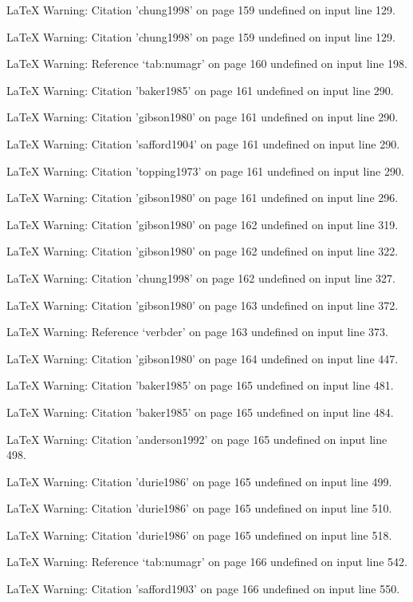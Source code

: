 LaTeX Warning: Citation 'chung1998' on page 159 undefined on input line 129.


LaTeX Warning: Citation 'chung1998' on page 159 undefined on input line 129.


LaTeX Warning: Reference `tab:numagr' on page 160 undefined on input line 198.


LaTeX Warning: Citation 'baker1985' on page 161 undefined on input line 290.


LaTeX Warning: Citation 'gibson1980' on page 161 undefined on input line 290.


LaTeX Warning: Citation 'safford1904' on page 161 undefined on input line 290.


LaTeX Warning: Citation 'topping1973' on page 161 undefined on input line 290.


LaTeX Warning: Citation 'gibson1980' on page 161 undefined on input line 296.


LaTeX Warning: Citation 'gibson1980' on page 162 undefined on input line 319.


LaTeX Warning: Citation 'gibson1980' on page 162 undefined on input line 322.


LaTeX Warning: Citation 'chung1998' on page 162 undefined on input line 327.


LaTeX Warning: Citation 'gibson1980' on page 163 undefined on input line 372.


LaTeX Warning: Reference `verbder' on page 163 undefined on input line 373.


LaTeX Warning: Citation 'gibson1980' on page 164 undefined on input line 447.


LaTeX Warning: Citation 'baker1985' on page 165 undefined on input line 481.


LaTeX Warning: Citation 'baker1985' on page 165 undefined on input line 484.


LaTeX Warning: Citation 'anderson1992' on page 165 undefined on input line 498.


LaTeX Warning: Citation 'durie1986' on page 165 undefined on input line 499.


LaTeX Warning: Citation 'durie1986' on page 165 undefined on input line 510.


LaTeX Warning: Citation 'durie1986' on page 165 undefined on input line 518.


LaTeX Warning: Reference `tab:numagr' on page 166 undefined on input line 542.


LaTeX Warning: Citation 'safford1903' on page 166 undefined on input line 550.


